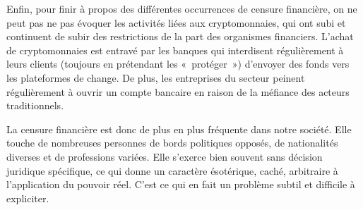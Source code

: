 \clearpage
Enfin, pour finir à propos des différentes occurrences de censure financière, on ne peut pas ne pas évoquer les activités liées aux cryptomonnaies, qui ont subi et continuent de subir des restrictions de la part des organismes financiers. L'achat de cryptomonnaies est entravé par les banques qui interdisent régulièrement à leurs clients (toujours en prétendant les «~protéger~») d'envoyer des fonds vers les plateformes de change. De plus, les entreprises du secteur peinent régulièrement à ouvrir un compte bancaire en raison de la méfiance des acteurs traditionnels.

La censure financière est donc de plus en plus fréquente dans notre société. Elle touche de nombreuses personnes de bords politiques opposés, de nationalités diverses et de professions variées. Elle s'exerce bien souvent sans décision juridique spécifique, ce qui donne un caractère ésotérique, caché, arbitraire à l'application du pouvoir réel. C'est ce qui en fait un problème subtil et difficile à expliciter.

